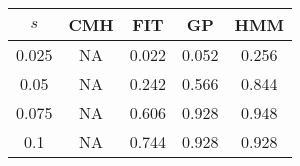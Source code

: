 \centering \begin{tabular}{c|c|c|c|c}
$s$	&CMH	&FIT	&GP	&HMM\\\hline
0.025	&NA	&0.022	&0.052	&0.256\\
0.05	&NA	&0.242	&0.566	&0.844\\
0.075	&NA	&0.606	&0.928	&0.948\\
0.1	&NA	&0.744	&0.928	&0.928\\
\end{tabular}
